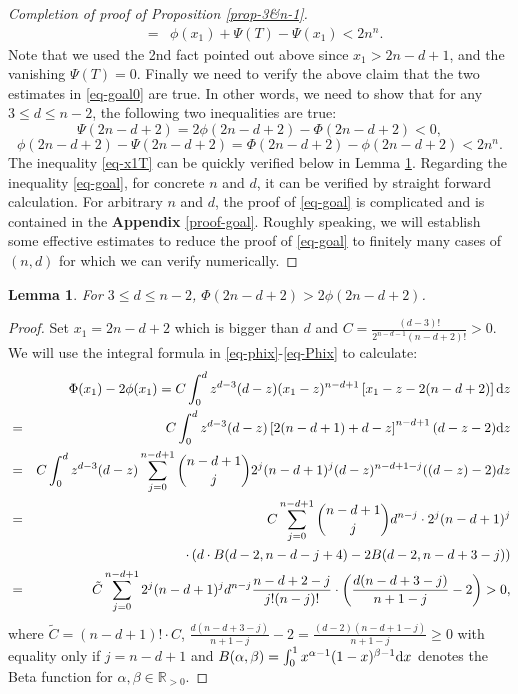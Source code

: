 \documentclass[12pt]{amsart}
\newtheorem{lem}[thm]{Lemma}
\theoremstyle{definition}
\def\dif{{\rm d}}
\begin{document}
\begin{proof}[Completion of proof of Proposition \ref{prop-3&n-1}]
\begin{eqnarray*}
      &=&\phi(x_1)+\Psi(T)-\Psi(x_1)<2n^n. 
   \end{eqnarray*}
Note that we used the 2nd fact pointed out above since $x_1>2n-d+1$, and the vanishing $\Psi(T)=0$. 
Finally we need to verify the above claim that the two estimates in \eqref{eq-goal0} are true. 
In other words, we need to show that for any $3\le d\le n-2$, the following two inequalities are true:
\begin{equation}\label{eq-x1T}
    \Psi(2n-d+2)=2\phi(2n-d+2)-\Phi(2n-d+2)<0, 
\end{equation}
\begin{equation}\label{eq-goal}
   \phi(2n-d+2)-\Psi(2n-d+2)=\Phi(2n-d+2)-\phi(2n-d+2)<2n^n. 
\end{equation}
The inequality \eqref{eq-x1T} can be quickly verified below in Lemma \ref{lem-x1T}. Regarding the inequality \eqref{eq-goal}, for concrete $n$ and $d$, it can be verified by straight forward calculation. For arbitrary $n$ and $d$, the proof of \eqref{eq-goal} is complicated and is contained in the \textbf{Appendix }\ref{proof-goal}. 
Roughly speaking, we will establish some effective estimates to reduce the proof of \eqref{eq-goal} to finitely many cases of $(n,d)$ for which we can verify numerically.
\end{proof}
\begin{lem}\label{lem-x1T}
For $3\le d\le n-2$, 
    $\Phi(2n-d+2)>2\phi(2n-d+2)$. 
\end{lem}
\begin{proof}
    Set $x_1=2n-d+2$ which is bigger than $d$ and
    $C=\frac{(d-3)!}{2^{n-d-1}(n-d+2)!}>0$.
We will use the integral formula in \eqref{eq-phix}-\eqref{eq-Phix} to calculate: 
\begin{eqnarray*}
  &&\Phi(x_1)-2\phi(x_1)=C\int_0^d z^{d-3}(d-z)(x_1-z)^{n-d+1}\left[x_1-z-2(n-d+2)\right]\dif z\\
  &=&C\int_0^d z^{d-3}(d-z)\left[2(n-d+1)+d-z\right]^{n-d+1}(d-z-2)\dif z\\
  &=&C \int_0^d z^{d-3}(d-z)\sum_{j=0}^{n-d+1}\binom{n-d+1}{j}2^j(n-d+1)^j(d-z)^{n-d+1-j}((d-z)-2)dz\\
  &=&C\sum_{j=0}^{n-d+1}\binom{n-d+1}{j}d^{n-j}\cdot 2^j(n-d+1)^j\\
  &&\quad\cdot\left(d\cdot B(d-2, n-d-j+4)-2 B(d-2, n-d+3-j)\right)\\
  &=&\tilde{C}\sum_{j=0}^{n-d+1}2^j(n-d+1)^j d^{n-j}\frac{n-d+2-j}{j!(n-j)!} \cdot \left(\frac{d(n-d+3-j)}{n+1-j}-2\right)>0,
\end{eqnarray*}
where $\tilde{C}=(n-d+1)!\cdot C$,  $\frac{d(n-d+3-j)}{n+1-j}-2=\frac{(d-2)(n-d+1-j)}{n+1-j}\geq 0$ with equality only if $j=n-d+1$ and $B(\alpha,\beta)=\int_0^1 x^{\alpha-1}(1-x)^{\beta-1}\dif x$ denotes the Beta function for $\alpha,\beta \in \mathbb{R}_{>0}$.
\end{proof}
\end{document}
